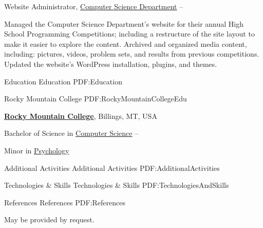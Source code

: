 \documentclass[letterpaper,MMMyyyy,nonstopmode]{simpleresumecv}
\begin{document}
\begin{Body}
\Gap
\BulletItem
Website Administrator,
\href{http://cs.rocky.edu/programming-competitions/high-school-competions/}
{Computer Science Department}
\hfill
{} --
\begin{Detail}
\SubBulletItem
Managed the Computer Science Department's website for their annual High School Programming Competitions;  including a restructure of the site layout to make it easier to explore the content.
\SubBulletItem
Archived and organized media content, including: pictures, videos, problem sets, and results from previous competitions.
\SubBulletItem
Updated the website's WordPress installation, plugins, and themes.
\end{Detail}


\Section
{Education}
{Education}
{PDF:Education}

\SubSection
{}
{Rocky Mountain College}
{PDF:RockyMountainCollegeEdu}

\Entry
\href{http://www.rocky.edu/}
{\textbf{Rocky Mountain College}},
Billings, MT, USA

\Gap
\BulletItem
Bachelor of Science in
\href{http://cs.rocky.edu/}
{Computer Science}
\hfill
{} --
\begin{Detail}
\SubBulletItem
Minor in 
\href{http://rocky.edu/academics/academic-programs/undergraduate-majors/psychology/}
{Psychology}
\end{Detail}


\Section
{Additional \newline Activities}
{Additional Activities}
{PDF:AdditionalActivities}


\Section
{Technologies \newline \& Skills}
{Technologies \& Skills}
{PDF:TechnologiesAndSkills}


\Section
{References}
{References}
{PDF:References}

May be provided by request.

\end{Body}
\end{document}
